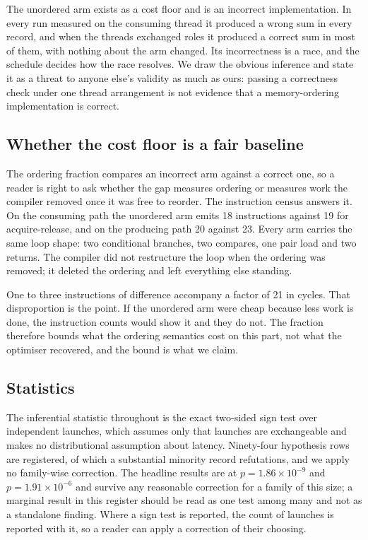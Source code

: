 \documentclass[conference]{IEEEtran}
\begin{document}
The unordered arm exists as a cost floor and is an incorrect implementation. In
every run measured on the consuming thread it produced a wrong sum in every
record, and when the threads exchanged roles it produced a correct sum in most
of them, with nothing about the arm changed. Its incorrectness is a race, and
the schedule decides how the race resolves. We draw the obvious inference and
state it as a threat to anyone else's validity as much as ours: passing a
correctness check under one thread arrangement is not evidence that a
memory-ordering implementation is correct.

\subsection{Whether the cost floor is a fair baseline}

The ordering fraction compares an incorrect arm against a correct one, so a
reader is right to ask whether the gap measures ordering or measures work the
compiler removed once it was free to reorder. The instruction census answers
it. On the consuming path the unordered arm emits 18 instructions against 19
for acquire-release, and on the producing path 20 against 23. Every arm carries
the same loop shape: two conditional branches, two compares, one pair load and
two returns. The compiler did not restructure the loop when the ordering was
removed; it deleted the ordering and left everything else standing.

One to three instructions of difference accompany a factor of 21 in cycles.
That disproportion is the point. If the unordered arm were cheap because less
work is done, the instruction counts would show it and they do not. The
fraction therefore bounds what the ordering semantics cost on this part, not
what the optimiser recovered, and the bound is what we claim.

\subsection{Statistics}

The inferential statistic throughout is the exact two-sided sign test over
independent launches, which assumes only that launches are exchangeable and
makes no distributional assumption about latency. Ninety-four hypothesis rows
are registered, of which a substantial minority record refutations, and we
apply no family-wise correction. The headline results are at
$p = 1.86\times10^{-9}$ and $p = 1.91\times10^{-6}$ and survive any reasonable
correction for a family of this size; a marginal result in this register should
be read as one test among many and not as a standalone finding. Where a sign
test is reported, the count of launches is reported with it, so a reader can
apply a correction of their choosing.
\end{document}
